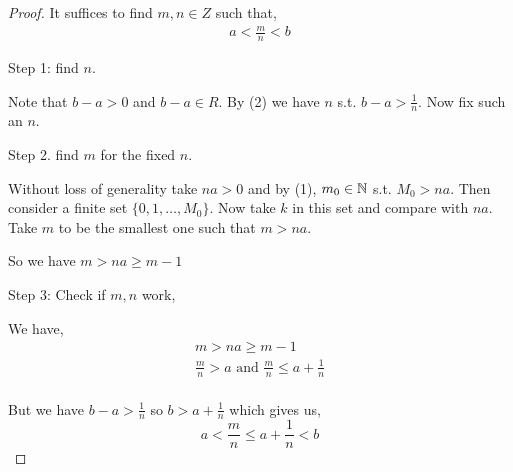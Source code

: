 \begin{proof}
    It suffices to find $m,n \in Z$ such that, 
    \begin{align*}
    a < \frac{m}{n} < b
    \end{align*}


    Step 1: find $n$.

    Note that   $ b - a > 0$  and  $b -a \in R$. By (2) we have  $n$ s.t.  $b - a > \frac{1}{n}$. Now fix such an $n$. 

    Step 2. find  $m$ for the fixed $n$.


    Without loss of generality take  $na > 0$ and by (1), $m_0 \in \mathbb{N}$ s.t. $M_0 > na$. Then consider a finite set $\{0, 1, \dots, M_0\}$. Now take  $k$ in this set and compare with $na$. Take  $m$ to be the smallest one such that $m > na$.

    So we have  $ m > na \ge m - 1$

    Step 3: Check if  $m, n$ work, 

    We have, 
    \begin{align*}
        m > na \ge m  -1 \\
        \frac{m}{n} > a \text{ and } \frac{m}{n} \le a + \frac{1}{n}\\
    \end{align*}


    But we have $b - a > \frac{1}{n}$ so $b > a + \frac{1}{n}$ which gives us, 
    $$ a < \frac{m}{n} \le a + \frac{1}{n} < b $$ 


\end{proof}


